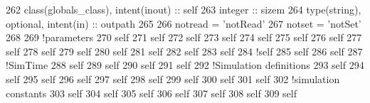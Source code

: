 \begin{DoxyCode}
262     \textcolor{keywordtype}{class}(globals\_class), \textcolor{keywordtype}{intent(inout)} :: self
263     \textcolor{keywordtype}{integer} :: sizem
264     \textcolor{keywordtype}{type}(string), \textcolor{keywordtype}{optional}, \textcolor{keywordtype}{intent(in)} :: outpath
265     
266     notread = \textcolor{stringliteral}{'notRead'}
267     notset = \textcolor{stringliteral}{'notSet'}
268     
269     \textcolor{comment}{!parameters}
270     self%
271     self%
272     self%
273     self%
274     self%
275     self%
276     self%
277     self%
278     self%
279     self%
280     self%
281     self%
282     self%
283     self%
284     \textcolor{comment}{!self%
285     self%
286     self%
287     \textcolor{comment}{!SimTime}
288     self%
289     self%
290     self%
291     self%
292     \textcolor{comment}{!Simulation definitions}
293     self%
294     self%
295     self%
296     self%
297     self%
298     self%
299     self%
300     self%
301     self%
302     \textcolor{comment}{!simulation constants}
303     self%
304     self%
305     self%
306     self%
307     self%
308     self%
309     self%
}
\end{DoxyCode}
